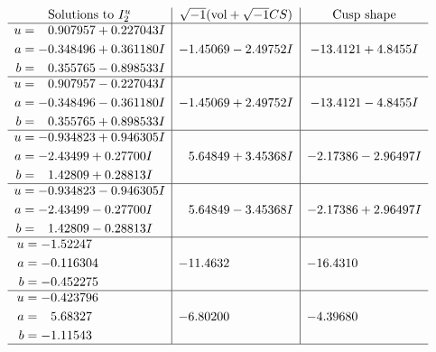 \documentclass[1p]{elsarticle_modified}
\theoremstyle{definition}
\newcommand{\I}{\sqrt{-1}}
\begin{document}
$$\begin{array}{c|c|c}  
\text{Solutions to }I^u_{2}& \I (\text{vol} + \sqrt{-1}CS) & \text{Cusp shape}\\
 \hline 
\begin{aligned}
u &= \phantom{-}0.907957 + 0.227043 I \\
a &= -0.348496 + 0.361180 I \\
b &= \phantom{-}0.355765 - 0.898533 I\end{aligned}
 & -1.45069 - 2.49752 I & -13.4121 + 4.8455 I \\ \hline\begin{aligned}
u &= \phantom{-}0.907957 - 0.227043 I \\
a &= -0.348496 - 0.361180 I \\
b &= \phantom{-}0.355765 + 0.898533 I\end{aligned}
 & -1.45069 + 2.49752 I & -13.4121 - 4.8455 I \\ \hline\begin{aligned}
u &= -0.934823 + 0.946305 I \\
a &= -2.43499 + 0.27700 I \\
b &= \phantom{-}1.42809 + 0.28813 I\end{aligned}
 & \phantom{-}5.64849 + 3.45368 I & -2.17386 - 2.96497 I \\ \hline\begin{aligned}
u &= -0.934823 - 0.946305 I \\
a &= -2.43499 - 0.27700 I \\
b &= \phantom{-}1.42809 - 0.28813 I\end{aligned}
 & \phantom{-}5.64849 - 3.45368 I & -2.17386 + 2.96497 I \\ \hline\begin{aligned}
u &= -1.52247\phantom{ +0.000000I} \\
a &= -0.116304\phantom{ +0.000000I} \\
b &= -0.452275\phantom{ +0.000000I}\end{aligned}
 & -11.4632\phantom{ +0.000000I} & -16.4310\phantom{ +0.000000I} \\ \hline\begin{aligned}
u &= -0.423796\phantom{ +0.000000I} \\
a &= \phantom{-}5.68327\phantom{ +0.000000I} \\
b &= -1.11543\phantom{ +0.000000I}\end{aligned}
 & -6.80200\phantom{ +0.000000I} & -4.39680\phantom{ +0.000000I}\\
 \hline 
 \end{array}$$\newpage\newpage\renewcommand{\arraystretch}{1}
\end{document}
